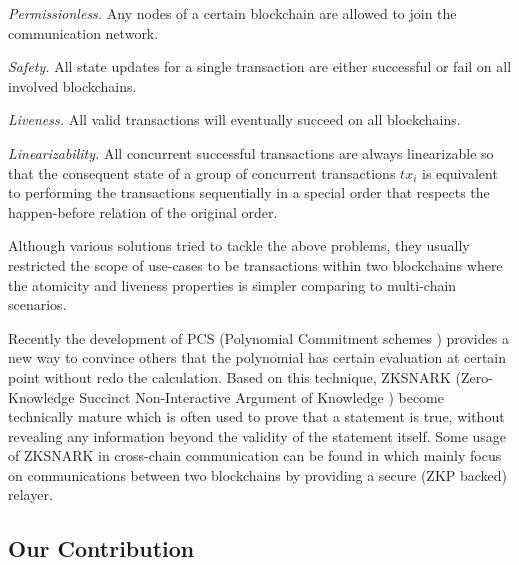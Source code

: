 \smallskip\noindent\emph{Permissionless.} Any nodes of a certain blockchain are allowed to join the communication network.

\smallskip\noindent\emph{Safety.} All state updates for a single transaction are either successful or fail on all involved blockchains.

\smallskip\noindent\emph{Liveness.} All valid transactions will eventually succeed on all blockchains.

\smallskip\noindent\emph{Linearizability.} All concurrent successful transactions are always linearizable so that the consequent state of a group of concurrent transactions $tx_i$ is equivalent to performing the transactions sequentially in a special order that respects the happen-before relation of the original order.

Although various solutions tried to tackle the above problems, they usually restricted the scope of use-cases to be transactions within two blockchains where the atomicity and liveness properties is simpler comparing to multi-chain scenarios.

Recently the development of PCS (Polynomial Commitment schemes \cite{boneh2020halo-pcs,boneh2020efficient-pcs,kate2010polynomial-pcs}) provides a new way to convince others that the polynomial has certain evaluation at certain point without redo the calculation. Based on this technique, ZKSNARK (Zero-Knowledge Succinct Non-Interactive Argument of Knowledge \cite{petkus2019and, groth2016size-scheme,chiesa2020marlin-scheme, gong2022analysis-scheme, setty2020spartan-scheme, fiore2016security-scheme}) become technically mature which is often used to prove that a statement is true, without revealing any information beyond the validity of the statement itself. Some usage of ZKSNARK in cross-chain communication can be found in \cite{sidechainzkp, cao2020-zk-atomic, garoffolo2020zendoo} which mainly focus on communications between two blockchains by providing a secure (ZKP backed) relayer.

\subsection{Our Contribution}

